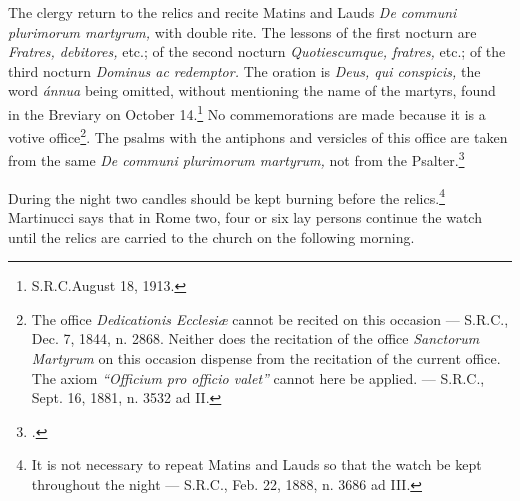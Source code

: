 \documentclass[letterpaper]{report}
\newcommand\src{\textsc{S.R.C.}}
\begin{document}
{    \rubric The clergy return to the relics and recite Matins and Lauds
    \textit{De communi plurimorum martyrum,} with double rite. The lessons of
    the first nocturn are \textit{Fratres, debitores,} etc.; of the second
    nocturn \textit{Quotiescumque, fratres,} etc.; of the third nocturn
    \textit{Dominus ac redemptor.} The oration is \textit{Deus, qui conspicis,}
    the word \textit{\'annua} being omitted, without mentioning the name of the
    martyrs, found in the Breviary on October 14.\footnote{\src August 18,
    1913.} No commemorations are made because it is a votive
    office\footnote{The office \textit{Dedicationis Ecclesi\ae} cannot be
    recited on this occasion --- \src, Dec. 7, 1844, n. 2868. Neither does the
    recitation of the office \textit{Sanctorum Martyrum} on this occasion
    dispense from the recitation of the current office. The axiom
    \textit{``Officium pro officio valet''} cannot here be applied. --- \src,
    Sept. 16, 1881, n. 3532 ad II.}. The psalms with the antiphons and
    versicles of this office are taken from the same \textit{De communi
    plurimorum martyrum,} not from the Psalter.\footcite[][n. 738.]{ml:1947}

    \rubric During the night two candles should be kept burning before the
    relics.\footnote{It is not necessary to repeat Matins and Lauds so that the
    watch be kept throughout the night --- \src, Feb. 22, 1888, n. 3686 ad
    III.} Martinucci says that in Rome two, four or six lay persons continue
    the watch until the relics are carried to the church on the following
    morning.

}
\end{document}
